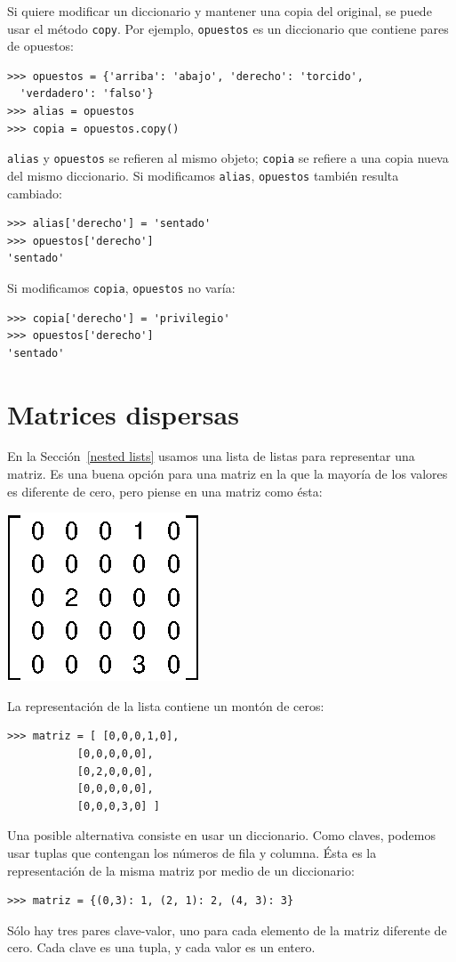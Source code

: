 Si quiere modificar un diccionario y mantener una copia del original,
se puede usar el método \texttt{copy}. Por ejemplo, \texttt{opuestos}
es un diccionario que contiene pares de opuestos:
\begin{lstlisting}
>>> opuestos = {'arriba': 'abajo', 'derecho': 'torcido', 
  'verdadero': 'falso'}
>>> alias = opuestos
>>> copia = opuestos.copy()
\end{lstlisting}
\texttt{alias} y \texttt{opuestos} se refieren al mismo objeto; \texttt{copia}
se refiere a una copia nueva del mismo diccionario. Si modificamos
\texttt{alias}, \texttt{opuestos} también resulta cambiado:
\begin{lstlisting}
>>> alias['derecho'] = 'sentado'
>>> opuestos['derecho']
'sentado'
\end{lstlisting}
Si modificamos \texttt{copia}, \texttt{opuestos} no varía:
\begin{lstlisting}
>>> copia['derecho'] = 'privilegio'
>>> opuestos['derecho']
'sentado'
\end{lstlisting}
\section{Matrices dispersas}

  

En la Sección~\ref{nested lists} usamos una lista de listas para
representar una matriz. Es una buena opción para una matriz en la
que la mayoría de los valores es diferente de cero, pero piense en
una matriz como ésta:

\beforefig\centerline{\includegraphics{illustrations/sparse}}

La representación de la lista contiene un montón de ceros:
\begin{lstlisting}
>>> matriz = [ [0,0,0,1,0],
           [0,0,0,0,0],
           [0,2,0,0,0],
           [0,0,0,0,0],
           [0,0,0,3,0] ]
\end{lstlisting}
Una posible alternativa consiste en usar un diccionario. Como claves,
podemos usar tuplas que contengan los números de fila y columna. Ésta
es la representación de la misma matriz por medio de un diccionario:
\begin{lstlisting}
>>> matriz = {(0,3): 1, (2, 1): 2, (4, 3): 3}
\end{lstlisting}
Sólo hay tres pares clave-valor, uno para cada elemento de la matriz
diferente de cero. Cada clave es una tupla, y cada valor es un entero.

